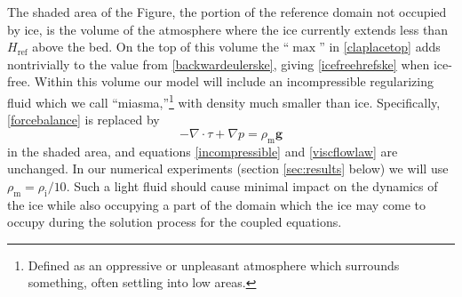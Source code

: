 \documentclass[letterpaper,final,12pt,reqno]{amsart}
\newcommand{\bg}{\mathbf{g}}
\newcommand{\rhoi}{\rho_{\text{i}}}
\newcommand{\Href}{H_{\text{ref}}}
\newcommand{\rhom}{\rho_{\text{m}}}
\begin{document}
The shaded area of the Figure, the portion of the reference domain not occupied by ice, is the volume of the atmosphere where the ice currently extends less than $\Href$ above the bed.  On the top of this volume the ``$\max$'' in \eqref{claplacetop} adds nontrivially to the value from \eqref{backwardeulerske}, giving \eqref{icefreehrefske} when ice-free.  Within this volume our model will include an incompressible regularizing fluid which we call ``miasma,''\footnote{Defined as an oppressive or unpleasant atmosphere which surrounds something, often settling into low areas.} with density much smaller than ice.  Specifically, \eqref{forcebalance} is replaced by
\begin{equation}
- \nabla \cdot \tau + \nabla p = \rhom \bg \label{miasma}
\end{equation}
in the shaded area, and equations \eqref{incompressible} and \eqref{viscflowlaw} are unchanged.  In our numerical experiments (section \ref{sec:results} below) we will use $\rhom = \rhoi/10$.  Such a light fluid should cause minimal impact on the dynamics of the ice while also occupying a part of the domain which the ice may come to occupy during the solution process for the coupled equations.
\end{document}
